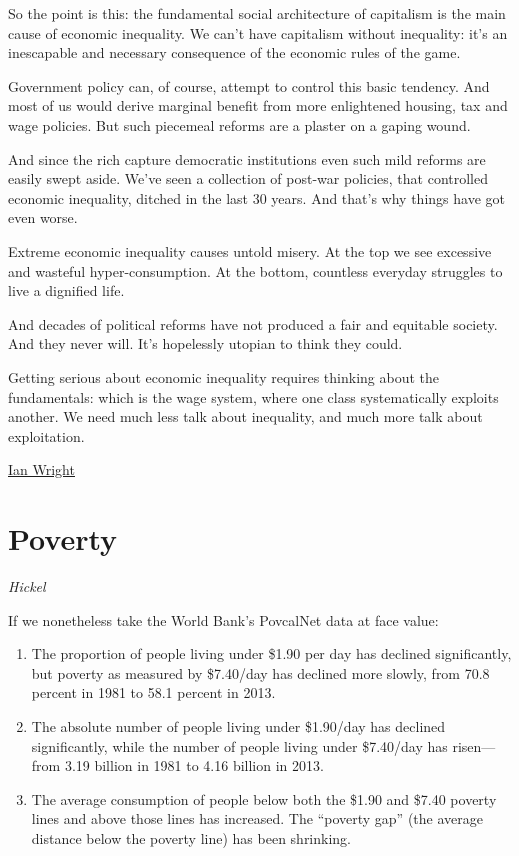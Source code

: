 \documentclass[
]{book}
\begin{document}
So the point is this: the fundamental social architecture of capitalism is the main cause of economic inequality. We can't have capitalism without inequality: it's an inescapable and necessary consequence of the economic rules of the game.

Government policy can, of course, attempt to control this basic tendency. And most of us would derive marginal benefit from more enlightened housing, tax and wage policies. But such piecemeal reforms are a plaster on a gaping wound.

And since the rich capture democratic institutions even such mild reforms are easily swept aside. We've seen a collection of post-war policies, that controlled economic inequality, ditched in the last 30 years. And that's why things have got even worse.

Extreme economic inequality causes untold misery. At the top we see excessive and wasteful hyper-consumption. At the bottom, countless everyday struggles to live a dignified life.

And decades of political reforms have not produced a fair and equitable society. And they never will. It's hopelessly utopian to think they could.

Getting serious about economic inequality requires thinking about the fundamentals: which is the wage system, where one class systematically exploits another. We need much less talk about inequality, and much more talk about exploitation.

\href{https://ianwrightsite.wordpress.com/2017/11/16/the-social-architecture-of-capitalism/}{Ian Wright}

\hypertarget{poverty}{%
\section{Poverty}\label{poverty}}

\emph{Hickel}

If we nonetheless take the World Bank's PovcalNet data at face value:

\begin{enumerate}
\def\labelenumi{\arabic{enumi}.}
\setcounter{enumi}{4}
\item
  The proportion of people living under \$1.90 per day has declined significantly, but poverty as measured by \$7.40/day has declined more slowly, from 70.8 percent in 1981 to 58.1 percent in 2013.
\item
  The absolute number of people living under \$1.90/day has declined significantly, while the number of people living under \$7.40/day has risen---from 3.19 billion in 1981 to 4.16 billion in 2013.
\item
  The average consumption of people below both the \$1.90 and \$7.40 poverty lines and above those lines has increased. The ``poverty gap'' (the average distance below the poverty line) has been shrinking.
\end{enumerate}
\end{document}
